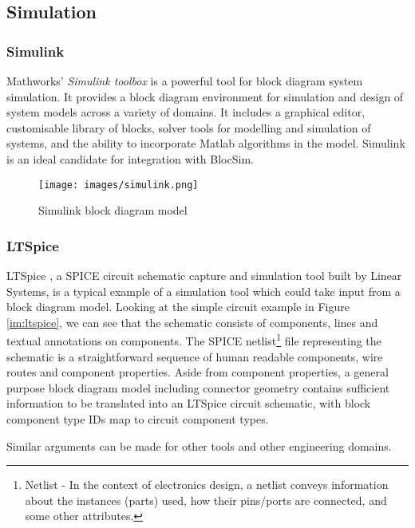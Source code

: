 \newpage

\subsection{Simulation}

\subsubsection{Simulink}

Mathworks' \textit{Simulink toolbox} \cite{simulink} is a powerful tool for block diagram system simulation. It provides a block diagram environment for simulation and design of system models across a variety of domains. It includes a graphical editor, customisable library of blocks, solver tools for modelling and simulation of systems, and the ability to incorporate Matlab algorithms in the model. Simulink is an ideal candidate for integration with BlocSim.

\begin{figure}[ht!]
\texttt{[image: images/simulink.png]} 
\centering
\caption{Simulink block diagram model}
\label{im:simulink}
\end{figure}

\subsubsection{LTSpice}

LTSpice \cite{ltspice}, a SPICE circuit schematic capture and simulation tool built by Linear Systems, is a typical example of a simulation tool which could take input from a block diagram model. Looking at the simple circuit example in Figure \ref{im:ltspice}, we can see that the schematic consists of components, lines and textual annotations on components. The SPICE netlist\footnote{Netlist - In the context of electronics design, a netlist conveys information about the instances (parts) used, how their pins/ports are connected, and some other attributes.} file representing the schematic is a straightforward sequence of human readable components, wire routes and component properties. Aside from component properties, a general purpose block diagram model including connector geometry contains sufficient information to be translated into an LTSpice circuit schematic, with block component type IDs map to circuit component types.

Similar arguments can be made for other tools and other engineering domains.

